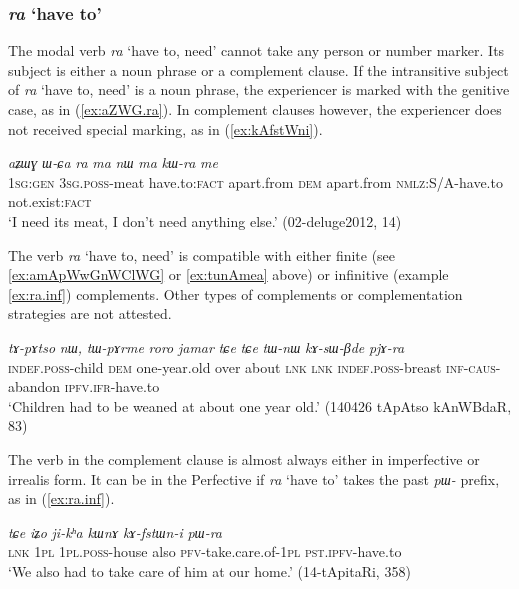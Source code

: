 \documentclass[oneside,a4paper,11pt]{article}
\newcommand{\ipa}[1]{\textit{\phon#1}}
\newcommand{\jpg}[2]{\ipa{#1} `#2'}
\newcommand{\refb}[1]{(\ref{#1})}
\begin{document}
  \subsubsection{\jpg{ra}{have to}} \label{sec:ra}
  The modal verb \jpg{ra}{have to, need} cannot take any person or number marker. Its subject is either a noun phrase or a complement clause. If the intransitive subject of \jpg{ra}{have to, need} is a noun phrase, the experiencer is marked with the genitive case, as in (\ref{ex:aZWG.ra}). In complement clauses however, the experiencer does not received special marking, as in \refb{ex:kAfstWni}.
    
  \begin{exe}
\ex \label{ex:aZWG.ra}
\gll \ipa{aʑɯɣ} 	\ipa{ɯ-ɕa} 	\ipa{ra} 	\ipa{ma} 	\ipa{nɯ} 	\ipa{ma} 	\ipa{kɯ-ra} 	\ipa{me} \\
\textsc{1sg:gen} \textsc{3sg.poss}-meat have.to:\textsc{fact} apart.from \textsc{dem} apart.from \textsc{nmlz:S/A}-have.to not.exist:\textsc{fact} \\
\glt `I need its meat, I don't need anything else.' (02-deluge2012, 14)
\end{exe}
 
 The verb \jpg{ra}{have to, need}  is compatible with either finite (see \ref{ex:amApWwGnWClWG} or \ref{ex:tunAmea} above) or infinitive (example \ref{ex:ra.inf}) complements. Other types of complements or complementation strategies are not attested.
 
 \begin{exe}
\ex \label{ex:ra.inf}
\gll   \ipa{tɤ-pɤtso} 	\ipa{nɯ,} 	\ipa{tɯ-pɤrme} 	\ipa{roro} 	\ipa{jamar} 	\ipa{tɕe} 	\ipa{tɕe} 	\ipa{tɯ-nɯ} 	\ipa{kɤ-sɯ-βde} 	\ipa{pjɤ-ra}  \\
\textsc{indef.poss}-child \textsc{dem} one-year.old over about \textsc{lnk} \textsc{lnk} \textsc{indef.poss}-breast \textsc{inf-caus}-abandon \textsc{ipfv.ifr}-have.to \\
\glt `Children had to be weaned at about one year old.' (140426 tApAtso kAnWBdaR, 83)
\end{exe}  

The verb in the complement clause is almost always either in imperfective or irrealis form. It can be in the Perfective if \jpg{ra}{have to} takes the past \ipa{pɯ-} prefix, as in (\ref{ex:ra.inf}).

 \begin{exe}
\ex \label{ex:kAfstWni}
\gll 
\ipa{tɕe} 	\ipa{iʑo} 	\ipa{ji-kʰa} 	\ipa{kɯnɤ} 	\ipa{kɤ-fstɯn-i} 	\ipa{pɯ-ra} \\
\textsc{lnk} \textsc{1pl} \textsc{1pl.poss}-house also \textsc{pfv}-take.care.of-\textsc{1pl} \textsc{pst.ipfv}-have.to \\
\glt `We also had to take care of him at our home.' (14-tApitaRi, 358)
\end{exe}  
\end{document}
